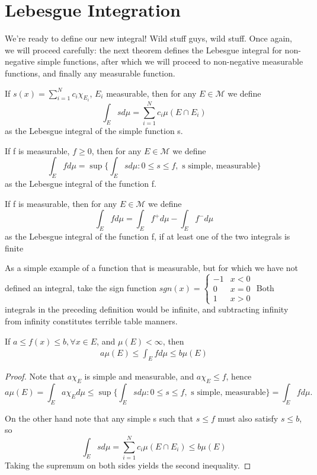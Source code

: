 \documentclass[11pt]{scrartcl}
\begin{document}
\section{Lebesgue Integration} 

We're ready to define our new integral! Wild stuff guys, wild stuff. Once again, we will proceed carefully: the next theorem defines the Lebesgue integral for non-negative simple functions, after which we will proceed to non-negative measurable functions, and finally any measurable function.

\begin{definition}
If $s(x) = \sum_{i=1}^N c_i \chi_{E_i}$, $E_i$ measurable, then for any $E\in \mathcal{M}$ we define $$\int_E s d\mu = \sum_{i=1}^N c_i \mu(E\cap E_i)$$ 
as the Lebesgue integral of the simple function s.
\end{definition}
\begin{definition}
If f is measurable, $f\geq 0$, then for any $E\in \mathcal{M}$ we define $$\int_E f d\mu = \sup \{ \int_E s d\mu: 0\leq s\leq f, \text{ s simple, measurable}\}$$ 
as the Lebesgue integral of the function f.
\end{definition}
\begin{definition}
If f is measurable, then for any $E\in \mathcal{M}$ we define $$\int_E f d\mu = \int_E f^+ d\mu - \int_E f^- d\mu$$ 
as the Lebesgue integral of the function f, if at least one of the two integrals is finite
\end{definition}

\begin{example}
As a simple example of a function that is measurable, but for which we have not defined an integral, take the sign function 
$sgn(x) = \begin{cases} 
-1 & x < 0 \\
 0 & x = 0 \\
 1 & x > 0 
\end{cases}$
Both integrals in the preceding definition would be infinite, and subtracting infinity from infinity constitutes terrible table manners.
\end{example}

\begin{proposition}
If $a\leq f(x) \leq b, \forall x\in E$, and $\mu(E)<\infty$, then 
\begin{align*}
a \mu(E) \leq \int_E f d\mu \leq b \mu(E) \tag{*}
\end{align*}
\end{proposition}
\begin{proof}
Note that $a \chi_E$ is simple and measurable, and $a \chi_E \leq f$, hence $$a \mu(E) =  \int_E a \chi_E d\mu \leq \sup \{ \int_E s d\mu: 0\leq s\leq f, \text{ s simple, measurable}\} = \int_E f d\mu .$$

On the other hand note that any simple s such that $s\leq f$ must also satisfy $s\leq b$, so $$\int_E s d\mu = \sum_{i=1}^N c_i \mu(E\cap E_i) \leq b \mu(E)$$
Taking the supremum on both sides yields the second inequality.
\end{proof}
\end{document}
